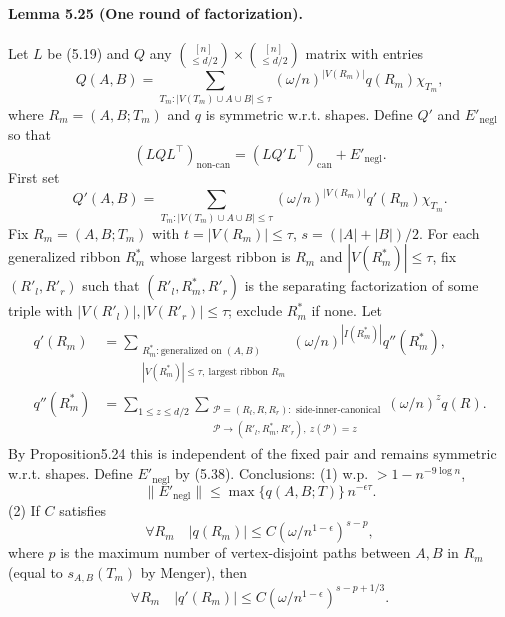 \paragraph{Lemma 5.25 (One round of factorization).} Let $L$ be (5.19) and $Q$ any $\binom{[n]}{\le d/2}\times\binom{[n]}{\le d/2}$ matrix with entries
\[Q(A,B)=\sum_{T_m:|V(T_m)\cup A\cup B|\le\tau}(\omega/n)^{|V(R_m)|}q(R_m)\chi_{T_m},\tag{5.37}\]
where $R_m=(A,B;T_m)$ and $q$ is symmetric w.r.t. shapes. Define $Q'$ and $E'_{\mathrm{negl}}$ so that
\[(LQL^\top)_{\mathrm{non\text{-}can}}=(LQ'L^\top)_{\mathrm{can}}+E'_{\mathrm{negl}}.\tag{5.38}\]
First set
\[Q'(A,B)=\sum_{T_m:|V(T_m)\cup A\cup B|\le\tau}(\omega/n)^{|V(R_m)|}q'(R_m)\chi_{T_m}.\tag{5.39}\]
Fix $R_m=(A,B;T_m)$ with $t=|V(R_m)|\le\tau$, $s=(|A|+|B|)/2$. For each generalized ribbon $R^*_m$ whose largest ribbon is $R_m$ and $|V(R^*_m)|\le\tau$, fix $(R'_l,R'_r)$ such that $(R'_l,R^*_m,R'_r)$ is the separating factorization of some triple with $|V(R'_l)|,|V(R'_r)|\le\tau$; exclude $R^*_m$ if none. Let
\begin{align*}q'(R_m)&=\sum_{\substack{R^*_m:\text{generalized on }(A,B)\\|V(R^*_m)|\le\tau,\ \text{largest ribbon }R_m}}(\omega/n)^{|I(R^*_m)|}q''(R^*_m),\\q''(R^*_m)&=\sum_{1\le z\le d/2}\sum_{\substack{\mathcal P=(R_l,R,R_r):\text{ side-inner-canonical}\\\mathcal P\to(R'_l,R^*_m,R'_r),\ z(\mathcal P)=z}}(\omega/n)^zq(R).\tag{5.40}\end{align*}
By Proposition5.24 this is independent of the fixed pair and remains symmetric w.r.t. shapes. Define $E'_{\mathrm{negl}}$ by (5.38). Conclusions: (1) w.p. $>1-n^{-9\log n}$,
\[\|E'_{\mathrm{negl}}\|\le\max\{q(A,B;T)\}\,n^{-\epsilon\tau}.\]
(2) If $C$ satisfies
\[\forall R_m\quad|q(R_m)|\le C(\omega/n^{1-\epsilon})^{s-p},\tag{5.41}\]
where $p$ is the maximum number of vertex-disjoint paths between $A,B$ in $R_m$ (equal to $s_{A,B}(T_m)$ by Menger), then
\[\forall R_m\quad|q'(R_m)|\le C(\omega/n^{1-\epsilon})^{s-p+1/3}.\]
